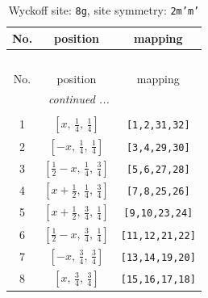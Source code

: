 \documentclass[fleqn,8pt]{jsarticle}
\begin{document}
\begin{longtable}{ccc}
\caption{Wyckoff site: {\tt 8g}, site symmetry: {\tt 2m'm'}}
 \\
 \hline \hline
No. & position & mapping \\ \hline \endfirsthead

\multicolumn{2}{l}{\tablename\ \thetable{}} \\
 \hline \hline
No. & position & mapping \\ \hline \endhead

 \hline \hline
\multicolumn{2}{r}{\footnotesize\it continued ...} \\ \endfoot

 \hline \hline
\multicolumn{2}{r}{} \\ \endlastfoot

1 & $\left[ x,\, \frac{1}{4},\, \frac{1}{4} \right]$ & {\tt [1,2,31,32]} \\ \hline
2 & $\left[ - x,\, \frac{1}{4},\, \frac{1}{4} \right]$ & {\tt [3,4,29,30]} \\ \hline
3 & $\left[ \frac{1}{2} - x,\, \frac{1}{4},\, \frac{3}{4} \right]$ & {\tt [5,6,27,28]} \\ \hline
4 & $\left[ x + \frac{1}{2},\, \frac{1}{4},\, \frac{3}{4} \right]$ & {\tt [7,8,25,26]} \\ \hline
5 & $\left[ x + \frac{1}{2},\, \frac{3}{4},\, \frac{1}{4} \right]$ & {\tt [9,10,23,24]} \\ \hline
6 & $\left[ \frac{1}{2} - x,\, \frac{3}{4},\, \frac{1}{4} \right]$ & {\tt [11,12,21,22]} \\ \hline
7 & $\left[ - x,\, \frac{3}{4},\, \frac{3}{4} \right]$ & {\tt [13,14,19,20]} \\ \hline
8 & $\left[ x,\, \frac{3}{4},\, \frac{3}{4} \right]$ & {\tt [15,16,17,18]} \\
\end{longtable}
\renewcommand{\arraystretch}{1.2}
\end{document}

